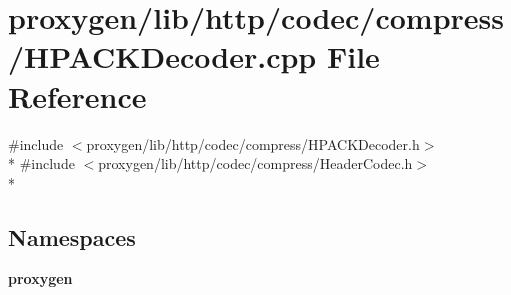 \section{proxygen/lib/http/codec/compress/\+H\+P\+A\+C\+K\+Decoder.cpp File Reference}
\label{HPACKDecoder_8cpp}
{\ttfamily \#include $<$proxygen/lib/http/codec/compress/\+H\+P\+A\+C\+K\+Decoder.\+h$>$}\\*
{\ttfamily \#include $<$proxygen/lib/http/codec/compress/\+Header\+Codec.\+h$>$}\\*
\subsection*{Namespaces}
\begin{DoxyCompactItemize}
\item 
 {\bf proxygen}
\end{DoxyCompactItemize}
